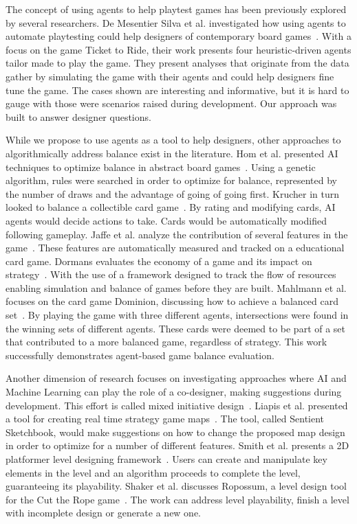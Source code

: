 \documentclass[letterpaper]{article} %
\begin{document}
The concept of using agents to help playtest games has been previously explored by several researchers. De Mesentier Silva et al. investigated how using agents to automate playtesting could help designers of contemporary board games~\cite{de2017modernboardgameworkshopai,de2017contemporaryboardgameai,de2018EvolvingMaps}. With a focus on the game Ticket to Ride, their work presents four heuristic-driven agents tailor made to play the game. They present analyses that originate from the data gather by simulating the game with their agents and could help designers fine tune the game. The cases shown are interesting and informative, but it is hard to gauge with those were scenarios raised during development. Our approach was built to answer designer questions.

While we propose to use agents as a tool to help designers, other approaches to algorithmically address balance exist in the literature. Hom et al. presented AI techniques to optimize balance in abstract board games~\cite{[1]hom2007automatic}. Using a genetic algorithm, rules were searched in order to optimize for balance, represented by the number of draws and the advantage of going of going first. Krucher in turn looked to balance a collectible card game~\cite{[4]r2014}. By rating and modifying cards, AI agents would decide actions to take. Cards would be automatically modified following gameplay. Jaffe et al. analyze the contribution of several features in the game~\cite{[3]jaffe2012evaluating}. These features are automatically measured and tracked on a educational card game. Dormans evaluates the economy of a game and its impact on strategy~\cite{dormans2011simulating}. With the use of a framework designed to track the flow of resources enabling simulation and balance of games before they are built. Mahlmann et al. focuses on the card game Dominion, discussing how to achieve a balanced card set~\cite{[2]mahlmann2012evolving}. By playing the game with three different agents, intersections were found in the winning sets of different agents. These cards were deemed to be part of a set that contributed to a more balanced game, regardless of strategy. This work successfully demonstrates agent-based game balance evaluation.

Another dimension of research focuses on investigating approaches where AI and Machine Learning can play the role of a co-designer, making suggestions during development. This effort is called mixed initiative design~\cite{yannakakis2014mixed}. Liapis et al. presented a tool for creating real time strategy game maps~\cite{liapis2013sentient}. The tool, called Sentient Sketchbook, would make suggestions on how to change the proposed map design in order to optimize for a number of different features. Smith et al. presents a 2D platformer level designing framework~\cite{smith2010tanagra}. Users can create and manipulate key elements in the level and an algorithm proceeds to complete the level, guaranteeing its playability. Shaker et al. discusses Ropossum, a level design tool for the Cut the Rope game~\cite{shaker2013ropossum}. The work can address level playability, finish a level with incomplete design or generate a new one.
\end{document}
